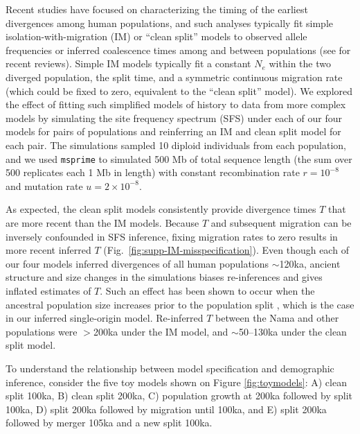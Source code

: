 \documentclass[]{article}
\newcommand{\msprime}{\texttt{msprime}\xspace}
\begin{document}
Recent studies have focused on characterizing the timing of the earliest
divergences among human populations, and such analyses
typically fit simple isolation-with-migration (IM) or ``clean split'' models to
observed allele frequencies or inferred coalescence times among and between
populations (see \citet{Weaver2008-ho,Bergstrom2021-iw} for recent reviews).
Simple IM models
typically fit a constant $N_e$ within the two diverged population, the split
time, and a symmetric continuous migration rate (which could be fixed to zero,
equivalent to the ``clean split'' model). We explored the effect of fitting
such simplified models of history to data from more complex models by
simulating the site frequency spectrum (SFS) under each of our four models for
pairs of populations and reinferring an IM and clean split model for each pair.
The simulations sampled 10 diploid individuals from each
population, and we used \msprime \citep{Baumdicker2022-mj} to simulated
500 Mb of total sequence length (the sum over 500 replicates each 1 Mb in length)
with constant recombination rate $r=10^{-8}$ and mutation rate $u=2\times10^{-8}.$

As expected, the clean split models consistently provide divergence times $T$
that are more recent than the IM models. Because $T$ and subsequent migration
can be inversely confounded in SFS inference, fixing migration rates to zero
results in more recent inferred $T$ (Fig.~\ref{fig:supp-IM-misspecification}).
Even though each of our four models inferred divergences of all human
populations $\sim$120ka, ancient structure and size changes in the simulations
biases re-inferences and gives inflated estimates of $T$. Such an effect has
been shown to occur when the ancestral population size increases prior to the
population split \citep{Momigliano2021-th}, which is the case in our inferred
single-origin model. Re-inferred $T$ between the Nama and other populations
were $>$200ka under the IM model, and $\sim$50--130ka under the clean split
model.

To understand the relationship between model specification and demographic inference, 
consider the five toy models shown on Figure \ref{fig:toymodels}: A) clean split 100ka, 
B) clean split 200ka, C) population growth at 200ka followed by split 100ka, 
D) split 200ka followed by migration until 100ka, and E) split 200ka followed by 
merger 105ka and a new split 100ka. 
\end{document}
